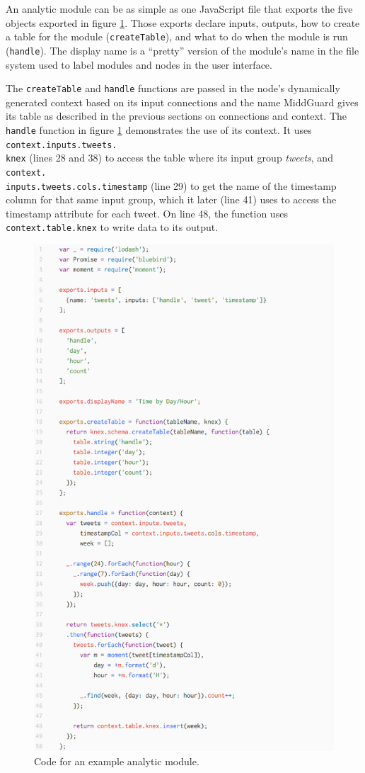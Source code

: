 \documentclass[midd]{thesis}
\begin{document}
An analytic module can be as simple as one JavaScript file that exports the five
objects exported in figure \ref{fig:analyticmodule}. Those exports declare
inputs, outputs, how to create a table for the module (\texttt{createTable}),
and what to do when the module is run (\texttt{handle}). The display name is a
``pretty'' version of the module's name in the file system used to label modules
and nodes in the user interface.

The \texttt{createTable} and \texttt{handle} functions are passed in the node's
dynamically generated context based on its input connections and the name
MiddGuard gives its table as described in the previous sections on connections
and context. The \texttt{handle} function in figure \ref{fig:analyticmodule}
demonstrates the use of its context. It uses
\texttt{context.inputs.tweets.\\knex} (lines 28 and 38) to access the table where
its input group \textit{tweets}, and
\texttt{context.\\inputs.tweets.cols.timestamp} (line 29) to get the name of the
timestamp column for that same input group, which it later (line 41) uses to
access the timestamp attribute for each tweet. On line 48, the function uses
\texttt{context.table.knex} to write data to its output.

\begin{figure}[!ht]
  \centering
  \includegraphics[width=.85\textwidth]{analyticmodule}
  \caption{Code for an example analytic module.}
  \label{fig:analyticmodule}
\end{figure}
\end{document}
